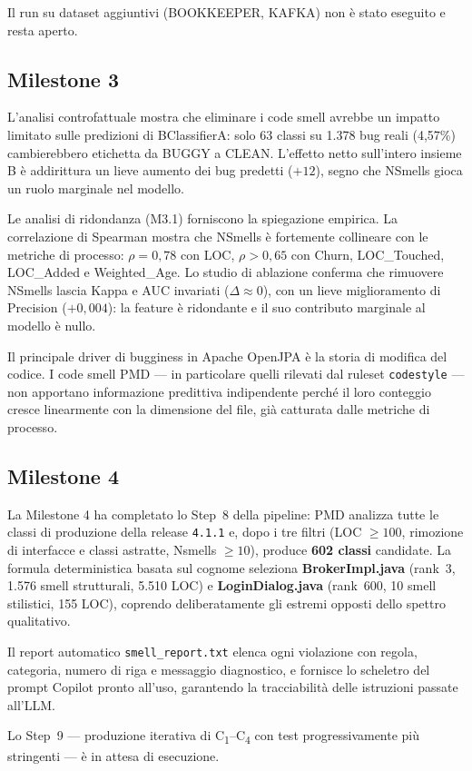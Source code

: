Il run su dataset aggiuntivi (BOOKKEEPER, KAFKA) non è stato eseguito e resta aperto.

\subsection{Milestone 3}

L'analisi controfattuale mostra che eliminare i code smell avrebbe un impatto limitato
sulle predizioni di BClassifierA: solo 63 classi su 1.378 bug reali (4,57\%)
cambierebbero etichetta da BUGGY a CLEAN. L'effetto netto sull'intero insieme B è
addirittura un lieve aumento dei bug predetti ($+12$), segno che NSmells gioca un
ruolo marginale nel modello.

Le analisi di ridondanza (M3.1) forniscono la spiegazione empirica. La correlazione di
Spearman mostra che NSmells è fortemente collineare con le metriche di processo: $\rho =
0{,}78$ con LOC, $\rho > 0{,}65$ con Churn, LOC\_Touched, LOC\_Added e Weighted\_Age. Lo
studio di ablazione conferma che rimuovere NSmells lascia Kappa e AUC invariati ($\Delta
\approx 0$), con un lieve miglioramento di Precision ($+0{,}004$): la feature è ridondante
e il suo contributo marginale al modello è nullo.

Il principale driver di bugginess in Apache OpenJPA è la storia di modifica del codice.
I code smell PMD --- in particolare quelli rilevati dal ruleset \texttt{codestyle} ---
non apportano informazione predittiva indipendente perché il loro conteggio cresce
linearmente con la dimensione del file, già catturata dalle metriche di processo.

\subsection{Milestone 4}

La Milestone 4 ha completato lo Step~8 della pipeline: PMD analizza tutte le classi
di produzione della release \texttt{4.1.1} e, dopo i tre filtri (LOC $\geq 100$,
rimozione di interfacce e classi astratte, Nsmells $\geq 10$), produce \textbf{602
classi} candidate. La formula deterministica basata sul cognome seleziona
\textbf{BrokerImpl.java} (rank~3, 1.576 smell strutturali, 5.510 LOC) e
\textbf{LoginDialog.java} (rank~600, 10 smell stilistici, 155 LOC), coprendo
deliberatamente gli estremi opposti dello spettro qualitativo.

Il report automatico \texttt{smell\_report.txt} elenca ogni violazione con regola,
categoria, numero di riga e messaggio diagnostico, e fornisce lo scheletro del prompt
Copilot pronto all'uso, garantendo la tracciabilità delle istruzioni passate all'LLM.

Lo Step~9 --- produzione iterativa di C\textsubscript{1}--C\textsubscript{4} con
test progressivamente più stringenti --- è in attesa di esecuzione.
